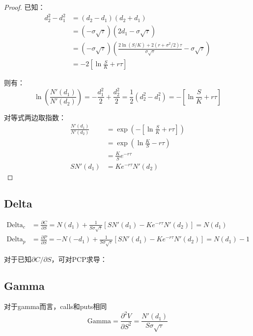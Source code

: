 \documentclass[11pt]{article}
\begin{document}
\begin{proof}
    已知：
    \begin{align*}
        d_2^2-d_1^2 &= (d_2-d_1)(d_2+d_1) \\
        &= (-\sigma\sqrt{\tau})(2d_1-\sigma\sqrt{\tau}) \\
        &= (-\sigma\sqrt{\tau})\left( \frac{2\ln(S/K) + 2(r+\sigma^2/2)\tau}{\sigma\sqrt{\tau}} -\sigma\sqrt{\tau}\right) \\
        &= -2\left[\ln\frac{S}{K}+r\tau\right]
    \end{align*}

    则有：
    \begin{equation*}
        \ln\left(\frac{N'(d_1)}{N'(d_2)}\right)
        = -\frac{d_1^2}{2} + \frac{d_2^2}{2}
        = \frac{1}{2} (d_2^2-d_1^2)
        = -\left[\ln\frac{S}{K} +r\tau\right]
    \end{equation*}

    对等式两边取指数：
    \begin{align*}
        \frac{N'(d_1)}{N'(d_2)} 
        &= \exp\left( -\left[\ln\frac{S}{K} +r\tau\right] \right) \\
        &= \exp \left( \ln\frac{K}{S}-r\tau \right) \\
        &= \frac{K}{S} e^{-r\tau} \\
        SN'(d_1) &= Ke^{-r\tau} N'(d_2)
    \end{align*}
\end{proof}

\subsection{Delta}
\noindent
\begin{align*}
    \text{Delta}_c &= \frac{\partial C}{\partial S}
    = N(d_1) + \frac{1}{S\sigma\sqrt{\tau}} \left[ SN'(d_1)-Ke^{-r\tau}N'(d_2) \right] = N(d_1) \\
    \text{Delta}_p &= \frac{\partial P}{\partial S}
    = -N(-d_1) + \frac{1}{S\sigma\sqrt{\tau}} \left[ SN'(d_1)-Ke^{-r\tau}N'(d_2) \right] = N(d_1)-1
\end{align*}

对于已知$\partial C/\partial S$，可对PCP求导：

\subsection{Gamma}
对于gamma而言，calls和puts相同
\begin{equation*}
    \text{Gamma} = \frac{\partial^2 V}{\partial S^2} = \frac{N'(d_1)}{S\sigma\sqrt{\tau}}
\end{equation*}
\end{document}
